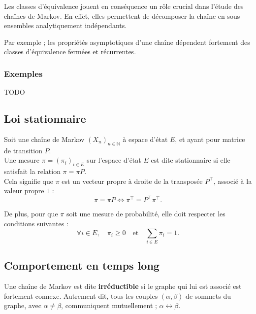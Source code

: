\documentclass{article}
\begin{document}
Les classes d'équivalence jouent en conséquence un rôle crucial dans l'étude des chaînes de Markov. En effet, elles permettent de décomposer la chaîne en sous-ensembles analytiquement indépendants.

Par exemple ; les propriétés asymptotiques d'une chaîne dépendent fortement des classes d'équivalence fermées et récurrentes. %

\subsubsection{Exemples}

TODO \\



\subsection{Loi stationnaire}

Soit une chaîne de Markov $(X_n)_{n \in \mathbb{N}}$ à espace d'état $E$, et ayant pour matrice de transition $P$. \\

Une mesure $\pi = (\pi_i)_{i \in E}$ sur l'espace d'état $E$ est dite stationnaire si elle satisfait la relation $\pi = \pi P$. \\

Cela signifie que $\pi$ est un vecteur propre à droite de la transposée $P^{\top}$, associé à la valeur propre $1$ :
\[
\pi = \pi P \iff \pi^{\top} = P^{\top} \pi^{\top}.
\]

De plus, pour que $\pi$ soit une mesure de probabilité, elle doit respecter les conditions suivantes :
\[
\forall i \in E, \quad \pi_i \geq 0 \quad \text{et} \quad \sum_{i \in E} \pi_i = 1.
\]

\subsection{Comportement en temps long}

Une chaîne de Markov est dite \textbf{irréductible} si le graphe qui lui est associé est fortement connexe. %
Autrement dit, tous les couples $(\alpha, \beta)$ de sommets du graphe, avec $\alpha \neq \beta$, communiquent mutuellement ; $\alpha \leftrightarrow \beta$. \\
\end{document}
